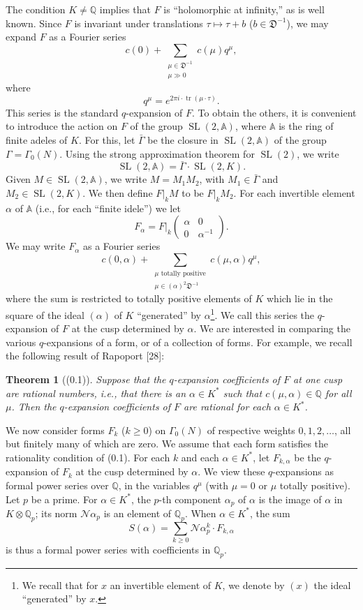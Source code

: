 \documentclass[12pt,a4paper]{article}
\theoremstyle{plain}
\newtheorem{theorem}{Theorem}[section]
\theoremstyle{definition}
\DeclareMathOperator{\SL}{SL}
\DeclareMathOperator{\tr}{tr}
\newcommand{\DD}{\mathfrak{D}}
\newcommand{\Q}{\mathbb{Q}}
\newcommand{\A}{\mathbb{A}}
\begin{document}
The condition $K\neq\Q$ implies that $F$ is ``holomorphic at infinity,'' as is well known. Since $F$ is invariant under translations $\tau\mapsto\tau+b$ ($b\in\DD^{-1}$), we may expand $F$ as a Fourier series
\[
c(0)+\sum_{\substack{\mu\in\DD^{-1}\\\mu\gg0}}c(\mu)q^{\mu},
\]
where
\[
q^{\mu}=e^{2\pi i\cdot\tr(\mu\cdot\tau)}.
\]
This series is the standard $q$-expansion of $F$. To obtain the others, it is convenient to introduce the action on $F$ of the group $\SL(2,\A)$, where $\A$ is the ring of finite adeles of $K$. For this, let $\bar{\Gamma}$ be the closure in $\SL(2,\A)$ of the group $\Gamma=\Gamma_0(N)$. Using the strong approximation theorem for $\SL(2)$, we write
\[
\SL(2,\A)=\bar{\Gamma}\cdot\SL(2,K).
\]
Given $M\in\SL(2,\A)$, we write $M=M_1M_2$, with $M_1\in\bar{\Gamma}$ and $M_2\in\SL(2,K)$. We then define $F|_kM$ to be $F|_kM_2$. For each invertible element $\alpha$ of $\A$ (i.e., for each ``finite idele'') we let
\[
F_{\alpha}=F\Big|_k\begin{pmatrix}\alpha&0\\0&\alpha^{-1}\end{pmatrix}.
\]
We may write $F_{\alpha}$ as a Fourier series
\[
c(0,\alpha)+\sum_{\substack{\mu\text{ totally positive}\\\mu\in(\alpha)^2\DD^{-1}}}c(\mu,\alpha)q^{\mu},
\]
where the sum is restricted to totally positive elements of $K$ which lie in the square of the ideal $(\alpha)$ of $K$ ``generated'' by $\alpha$\footnote{We recall that for $x$ an invertible element of $K$, we denote by $(x)$ the ideal ``generated'' by $x$.}. We call this series the $q$-expansion of $F$ at the cusp determined by $\alpha$. We are interested in comparing the various $q$-expansions of a form, or of a collection of forms. For example, we recall the following result of Rapoport [28]:

\begin{theorem}[(0.1)]
Suppose that the $q$-expansion coefficients of $F$ at one cusp are rational numbers, i.e., that there is an $\alpha\in K^*$ such that $c(\mu,\alpha)\in\Q$ for all $\mu$. Then the $q$-expansion coefficients of $F$ are rational for each $\alpha\in K^*$.
\end{theorem}

We now consider forms $F_k$ ($k\ge0$) on $\Gamma_0(N)$ of respective weights $0,1,2,\dots$, all but finitely many of which are zero. We assume that each form satisfies the rationality condition of (0.1). For each $k$ and each $\alpha\in K^*$, let $F_{k,\alpha}$ be the $q$-expansion of $F_k$ at the cusp determined by $\alpha$. We view these $q$-expansions as formal power series over $\Q$, in the variables $q^{\mu}$ (with $\mu=0$ or $\mu$ totally positive). Let $p$ be a prime. For $\alpha\in K^*$, the $p$-th component $\alpha_p$ of $\alpha$ is the image of $\alpha$ in $K\otimes\Q_p$; its norm $\mathcal{N}\alpha_p$ is an element of $\Q_p$. When $\alpha\in K^*$, the sum
\[
S(\alpha)=\sum_{k\ge0}\mathcal{N}\alpha_p^{k}\cdot F_{k,\alpha}
\]
is thus a formal power series with coefficients in $\Q_p$.
\end{document}
